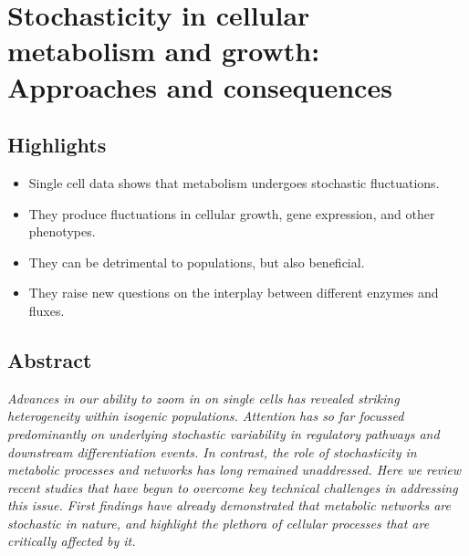 \chapter{Stochasticity in cellular metabolism and growth: Approaches and consequences}
\label{chapter:literaturereview}




\section*{Highlights}
\begin{itemize}[itemsep=1pt,parsep=1pt]
    \item Single cell data shows that metabolism undergoes stochastic fluctuations.
    \item They produce fluctuations in cellular growth, gene expression, and other phenotypes.
    \item They can be detrimental to populations, but also beneficial.
    \item They raise new questions on the interplay between different enzymes and fluxes.
\end{itemize}


\section*{Abstract}
\textit{
Advances in our ability to zoom in on single cells has revealed striking heterogeneity within isogenic populations. Attention has so far focussed predominantly on underlying stochastic variability in regulatory pathways and downstream differentiation events. In contrast, the role of stochasticity in metabolic processes and networks has long remained unaddressed. Here we review recent studies that have begun to overcome key technical challenges in addressing this issue. First findings have already demonstrated that metabolic networks are stochastic in nature, and highlight the plethora of cellular processes that are critically affected by it.
}


